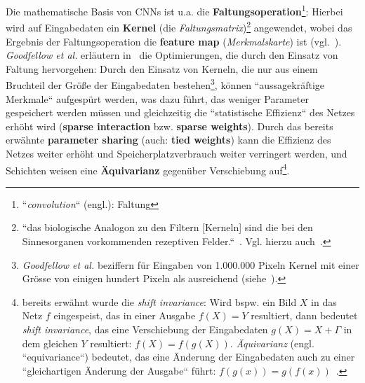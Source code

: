 Die mathematische Basis von CNNs ist u.a. die \textbf{Faltungsoperation}\footnote{
    ``\textit{convolution}`` (engl.): Faltung
}: Hierbei wird auf Eingabedaten ein \textbf{Kernel} (die \textit{Faltungsmatrix})\footnote{
    ``das biologische Analogon zu den Filtern [Kerneln] sind die bei den Sinnesorganen vorkommenden rezeptiven Felder.``~\cite[326]{Ert21b}. Vgl. hierzu auch~\cite[439]{LBH15}.
} angewendet, wobei das Ergebnis der Faltungsoperation die \textbf{feature map} (\textit{Merkmalskarte}) ist (vgl.~\cite[370]{GBC18}). \textit{Goodfellow et al.} erläutern in~\cite[374 ff.]{GBC18} die Optimierungen, die durch den Einsatz von Faltung hervorgehen: Durch den Einsatz von Kerneln, die nur aus einem Bruchteil der Größe der Eingabedaten bestehen\footnote{\textit{Goodfellow et al.} beziffern für Eingaben von 1.000.000 Pixeln Kernel mit einer Grösse von einigen hundert Pixeln als ausreichend (siehe~\cite[374]{GBC18}).
}, können ``aussagekräftige Merkmale`` aufgespürt werden, was dazu führt, das weniger Parameter gespeichert werden müssen und gleichzeitig die ``statistische Effizienz`` des Netzes erhöht wird (\textbf{sparse interaction} bzw. \textbf{sparse weights}). Durch das bereits erwähnte \textbf{parameter sharing} (auch: \textbf{tied weights}) kann die Effizienz des Netzes weiter erhöht und Speicherplatzverbrauch weiter verringert werden, und Schichten weisen eine \textbf{Äquivarianz} gegenüber Verschiebung auf\footnote{ bereits erwähnt wurde die \textit{shift invariance}: Wird bspw. ein Bild $X$ in das Netz $f$ eingespeist, das in einer Ausgabe $f(X) = Y$ resultiert, dann bedeutet \textit{shift invariance}, das eine Verschiebung der Eingabedaten $g(X) = X+\Gamma$ in dem gleichen $Y$ resultiert: $f(X) = f(g(X))$.  \textit{Äquivarianz} (engl. ``equivariance``) bedeutet, das eine Änderung der Eingabedaten auch zu einer ``gleichartigen Änderung der Ausgabe`` führt: $f(g(x)) = g(f(x))$~\cite[377]{GBC18}.
}.



